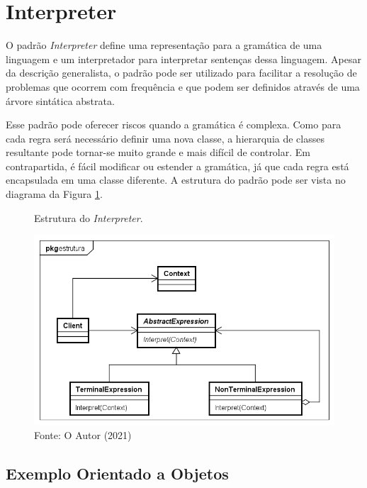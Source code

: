 \section{Interpreter}

O padrão \textit{Interpreter} define uma representação para 
a gramática de uma linguagem e um interpretador para 
interpretar sentenças dessa linguagem. Apesar da 
descrição generalista, o padrão 
pode ser utilizado para facilitar a resolução de 
problemas que ocorrem com frequência e que podem 
ser definidos através de uma árvore sintática 
abstrata.\cite{gamma:1995}

Esse padrão pode oferecer riscos quando a gramática 
é complexa. Como para cada regra será necessário 
definir uma nova classe, a hierarquia de classes 
resultante pode tornar-se muito grande e mais 
difícil de controlar. Em contrapartida, é 
fácil modificar ou estender a gramática, já 
que cada regra está encapsulada em uma classe 
diferente. A estrutura do padrão pode ser vista 
no diagrama da Figura \ref{interpreter_struct}.

\begin{figure}[htb]
	\caption{\label{interpreter_struct}Estrutura do \textit{Interpreter}.}
	\begin{center}
	    \includegraphics[scale=0.5]{5_padroes-contexto-funcional/5.3_comportamentais/5.3.03_interpreter/Interpreter_struct.png}
	\end{center}
  \caption*{Fonte: O Autor (2021)}
\end{figure}

\subsection*{Exemplo Orientado a Objetos}

